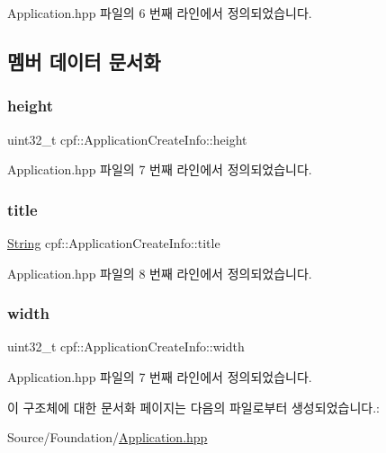 Application.\+hpp 파일의 6 번째 라인에서 정의되었습니다.



\subsection{멤버 데이터 문서화}
\mbox{\label{structcpf_1_1_application_create_info_ad4f22ba65d9f55b667fe38a729166ec1}} 
\subsubsection{\texorpdfstring{height}{height}}
{\footnotesize\ttfamily uint32\+\_\+t cpf\+::\+Application\+Create\+Info\+::height}



Application.\+hpp 파일의 7 번째 라인에서 정의되었습니다.

\mbox{\label{structcpf_1_1_application_create_info_a524aeb95e2ea78c56409a0d60f211be2}} 
\subsubsection{\texorpdfstring{title}{title}}
{\footnotesize\ttfamily \hyperlink{namespacecpf_a4dbd6992c3ed4440ce7ed8982ff7ffea}{String} cpf\+::\+Application\+Create\+Info\+::title}



Application.\+hpp 파일의 8 번째 라인에서 정의되었습니다.

\mbox{\label{structcpf_1_1_application_create_info_a5fbc8d17129dfb2bfe37432132e214c0}} 
\subsubsection{\texorpdfstring{width}{width}}
{\footnotesize\ttfamily uint32\+\_\+t cpf\+::\+Application\+Create\+Info\+::width}



Application.\+hpp 파일의 7 번째 라인에서 정의되었습니다.



이 구조체에 대한 문서화 페이지는 다음의 파일로부터 생성되었습니다.\+:\begin{DoxyCompactItemize}
\item 
Source/\+Foundation/\hyperlink{_application_8hpp}{Application.\+hpp}\end{DoxyCompactItemize}
